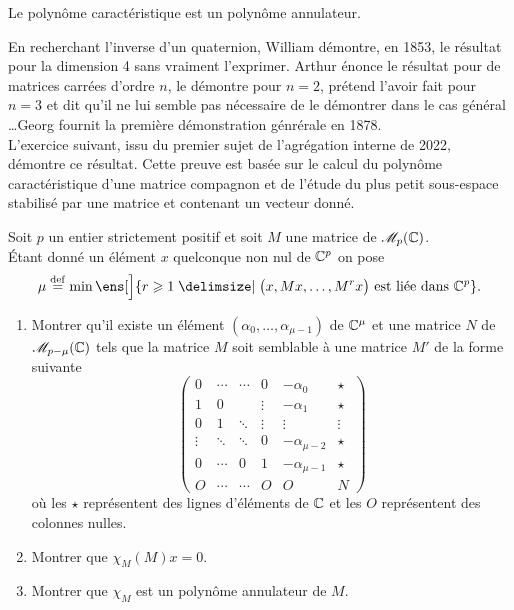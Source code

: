\begin{theo}
    Le polynôme caractéristique est un polynôme annulateur.
\end{theo}

En recherchant l'inverse d'un quaternion, William  démontre, en 1853, le résultat pour la dimension 4 sans vraiment l'exprimer. Arthur  énonce le résultat pour de matrices carrées d'ordre $n$, le démontre pour $n=2$, prétend l'avoir fait pour $n=3$ et dit qu'il ne lui semble pas nécessaire de le démontrer dans le cas général \dots Georg  fournit la première démonstration génrérale en 1878. \\

L'exercice suivant, issu du premier sujet de l'agrégation interne de 2022, démontre ce résultat. Cette preuve est basée sur le calcul du polynôme caractéristique d'une matrice compagnon et de l'étude du plus petit sous-espace stabilisé par une matrice et contenant un vecteur donné. \\

\begin{exercice}
    Soit $p$ un entier strictement positif et soit $M$ une matrice de $\mathscr{M}_p(\mathbb{C})$. \\
    Étant donné un élément $x$ quelconque non nul de $\mathbb{C}^p$ on pose
    $$\mu \defeq \min \ens[\Big]{ r \geqslant 1 \tq \big(x, Mx, \dots, M^r x \big) \text{ est liée dans } \C^p}.$$
    \begin{enumerate}
        \item Montrer qu'il existe un élément $(\alpha_0, \dots, \alpha_{\mu-1})$ de $\mathbb{C}^{\mu}$ et une matrice $N$ de $\mathscr{M}_{p-\mu}(\mathbb{C})$ tels que la matrice $M$ soit semblable à une matrice $M'$ de la forme suivante
        \[
        \begin{pmatrix}
        0 & \cdots & \cdots & 0 & -\alpha_0 & \star \\
        1 & 0 & & \vdots & -\alpha_1 & \star \\
        0 & 1 & \ddots & \vdots & \vdots & \vdots \\
        \vdots & \ddots & \ddots & 0 & -\alpha_{\mu-2} & \star \\
        0 & \cdots & 0 & 1 & -\alpha_{\mu-1} & \star \\
        O & \cdots & \cdots & O & O & N
        \end{pmatrix}
        \]
        où les $\star$ représentent des lignes d'éléments de $\mathbb{C}$ et les $O$ représentent des colonnes nulles. 
        \item Montrer que $\chi_M(M)x = 0$.
        \item Montrer que $\chi_M$ est un polynôme annulateur de $M$.
    \end{enumerate}
\end{exercice}


